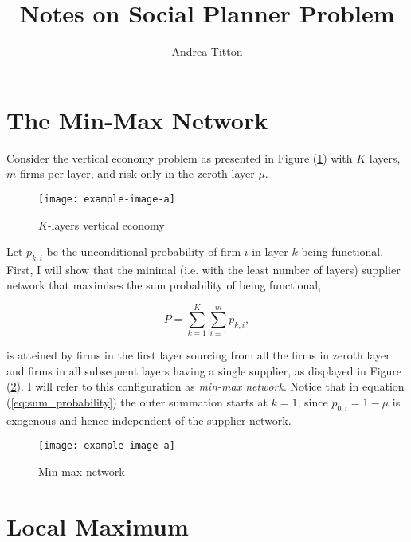 \documentclass[american, abstract=on]{scrartcl}
\author{Andrea Titton}
\title{Notes on Social Planner Problem}
\newcommand{\inputTikZ}[2]{%
    \scalebox{#1}{}  
    }
\theoremstyle{plain}
\begin{document}
\maketitle

\section{The Min-Max Network}

Consider the vertical economy problem as presented in Figure (\ref{fig:vertical-economy-diagram}) with $K$ layers, $m$ firms per layer, and risk only in the zeroth layer $\mu$.

\begin{figure}[H]
    \centering
    \texttt{[image: example-image-a]}
    \caption{$K$-layers vertical economy}
    \label{fig:vertical-economy-diagram}
\end{figure}

Let $p_{k, i}$ be the unconditional probability of firm $i$ in layer $k$ being functional. First, I will show that the minimal (i.e. with the least number of layers) supplier network that maximises the sum probability of being functional,

\begin{equation} \label{eq:sum_probability}
    P = \sum^{K}_{k = 1} \sum^m_{i = 1} p_{k, i},
\end{equation}

is atteined by firms in the first layer sourcing from all the firms in zeroth layer and firms in all subsequent layers having a single supplier, as displayed in Figure (\ref{fig:maximal-probability-diagram}). I will refer to this configuration as \textit{min-max network}. Notice that in equation (\ref{eq:sum_probability}) the outer summation starts at $k = 1$, since $p_{0, i} = 1 - \mu$ is exogenous and hence independent of the supplier network.

\begin{figure}[H]
    \centering
    \texttt{[image: example-image-a]}
    \caption{Min-max network} \label{fig:maximal-probability-diagram}
\end{figure}

\section{Local Maximum}
\end{document}
